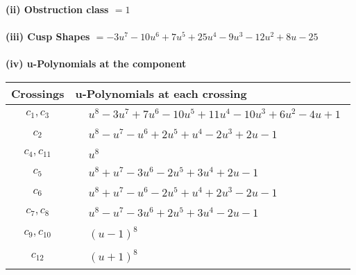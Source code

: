 \documentclass[1p]{elsarticle_modified}
\theoremstyle{definition}
\begin{document}
\flushleft \textbf{(ii) Obstruction class $= 1$}\\~\\
\flushleft \textbf{(iii) Cusp Shapes $= -3 u^7-10 u^6+7 u^5+25 u^4-9 u^3-12 u^2+8 u-25$}\\~\\
\newpage\renewcommand{\arraystretch}{1}
\flushleft \textbf{(iv) u-Polynomials at the component}\newline \\
\begin{tabular}{m{50pt}|m{274pt}}
Crossings & \hspace{64pt}u-Polynomials at each crossing \\
\hline $$\begin{aligned}c_{1},c_{3}\end{aligned}$$&$\begin{aligned}
&u^8-3 u^7+7 u^6-10 u^5+11 u^4-10 u^3+6 u^2-4 u+1
\end{aligned}$\\
\hline $$\begin{aligned}c_{2}\end{aligned}$$&$\begin{aligned}
&u^8- u^7- u^6+2 u^5+u^4-2 u^3+2 u-1
\end{aligned}$\\
\hline $$\begin{aligned}c_{4},c_{11}\end{aligned}$$&$\begin{aligned}
&u^8
\end{aligned}$\\
\hline $$\begin{aligned}c_{5}\end{aligned}$$&$\begin{aligned}
&u^8+u^7-3 u^6-2 u^5+3 u^4+2 u-1
\end{aligned}$\\
\hline $$\begin{aligned}c_{6}\end{aligned}$$&$\begin{aligned}
&u^8+u^7- u^6-2 u^5+u^4+2 u^3-2 u-1
\end{aligned}$\\
\hline $$\begin{aligned}c_{7},c_{8}\end{aligned}$$&$\begin{aligned}
&u^8- u^7-3 u^6+2 u^5+3 u^4-2 u-1
\end{aligned}$\\
\hline $$\begin{aligned}c_{9},c_{10}\end{aligned}$$&$\begin{aligned}
&(u-1)^8
\end{aligned}$\\
\hline $$\begin{aligned}c_{12}\end{aligned}$$&$\begin{aligned}
&(u+1)^8
\end{aligned}$\\
\hline
\end{tabular}\\~\\
\end{document}

